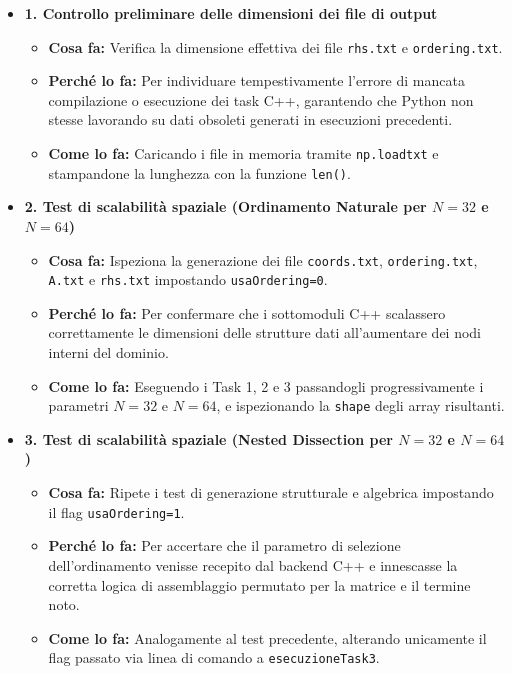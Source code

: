 \documentclass[twocolumn]{article}
\begin{document}
\begin{itemize}
    \item \textbf{1. Controllo preliminare delle dimensioni dei file di output}
    \begin{itemize}
        \item \textbf{Cosa fa:} Verifica la dimensione effettiva dei file \texttt{rhs.txt} e \texttt{ordering.txt}.
        \item \textbf{Perché lo fa:} Per individuare tempestivamente l'errore di mancata compilazione o esecuzione dei task C++, garantendo che Python non stesse lavorando su dati obsoleti generati in esecuzioni precedenti.
        \item \textbf{Come lo fa:} Caricando i file in memoria tramite \texttt{np.loadtxt} e stampandone la lunghezza con la funzione \texttt{len()}.
    \end{itemize}

    \item \textbf{2. Test di scalabilità spaziale (Ordinamento Naturale per $N=32$ e $N=64$)}
    \begin{itemize}
        \item \textbf{Cosa fa:} Ispeziona la generazione dei file \texttt{coords.txt}, \texttt{ordering.txt}, \texttt{A.txt} e \texttt{rhs.txt} impostando \texttt{usaOrdering=0}.
        \item \textbf{Perché lo fa:} Per confermare che i sottomoduli C++ scalassero correttamente le dimensioni delle strutture dati all'aumentare dei nodi interni del dominio.
        \item \textbf{Come lo fa:} Eseguendo i Task 1, 2 e 3 passandogli progressivamente i parametri $N=32$ e $N=64$, e ispezionando la \texttt{shape} degli array risultanti.
    \end{itemize}
\newpage
    \item \textbf{3. Test di scalabilità spaziale (Nested Dissection per $N=32$ e $N=64$)}
    \begin{itemize}
        \item \textbf{Cosa fa:} Ripete i test di generazione strutturale e algebrica impostando il flag \texttt{usaOrdering=1}.
        \item \textbf{Perché lo fa:} Per accertare che il parametro di selezione dell'ordinamento venisse recepito dal backend C++ e innescasse la corretta logica di assemblaggio permutato per la matrice e il termine noto.
        \item \textbf{Come lo fa:} Analogamente al test precedente, alterando unicamente il flag passato via linea di comando a \texttt{esecuzioneTask3}.
    \end{itemize}


\end{itemize}
\end{document}
